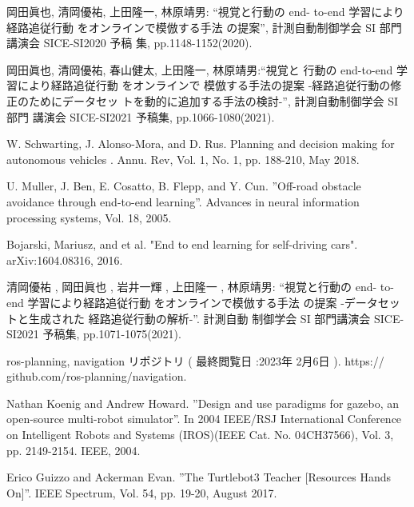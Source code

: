 \documentclass{jarticle}
\begin{document}
\footnotesize
\begin{thebibliography}{99}

岡田眞也, 清岡優祐, 上田隆一, 林原靖男: “視覚と行動の end-
to-end 学習により経路追従行動 をオンラインで模倣する手法
の提案”, 計測自動制御学会 SI 部門講演会 SICE-SI2020 予稿
集, pp.1148-1152(2020).

岡田眞也, 清岡優祐, 春山健太, 上田隆一, 林原靖男:“視覚と
行動の end-to-end 学習により経路追従行動 をオンラインで
模倣する手法の提案 -経路追従行動の修正のためにデータセッ
トを動的に追加する手法の検討-”, 計測自動制御学会 SI 部門
講演会 SICE-SI2021 予稿集, pp.1066-1080(2021).

W. Schwarting, J. Alonso-Mora, and D. Rus.
Planning and decision making for
autonomous vehicles . Annu. Rev, Vol. 1, No. 1, pp. 188-210, May 2018.

U. Muller, J. Ben, E. Cosatto, B. Flepp, and Y. Cun. ”Oﬀ-road obstacle avoidance
through end-to-end learning”. Advances in neural information processing systems,
Vol. 18, 2005.

Bojarski, Mariusz, and et al.
"End to end learning for self-driving cars".
arXiv:1604.08316, 2016.

清岡優祐 , 岡田眞也 , 岩井一輝 , 上田隆一 , 林原靖男: “視覚と行動の end-
to-end 学習により経路追従行動 をオンラインで模倣する手法
の提案 -データセットと生成された
経路追従行動の解析-”. 計測自動 制御学会 SI 部門講演会 SICE-SI2021 予稿集, pp.1071-1075(2021).

ros-planning, navigation リポジトリ ( 最終閲覧日 :2023年 2月6日 ). https://
github.com/ros-planning/navigation.

Nathan Koenig and Andrew Howard. ”Design and use paradigms for gazebo, an
open-source multi-robot simulator”. In 2004 IEEE/RSJ International Conference
on Intelligent Robots and Systems (IROS)(IEEE Cat. No. 04CH37566), Vol. 3, pp.
2149-2154. IEEE, 2004.

Erico Guizzo and Ackerman Evan. ”The Turtlebot3 Teacher [Resources Hands On]”.
IEEE Spectrum, Vol. 54, pp. 19-20, August 2017.

\end{thebibliography}

\normalsize
\end{document}
